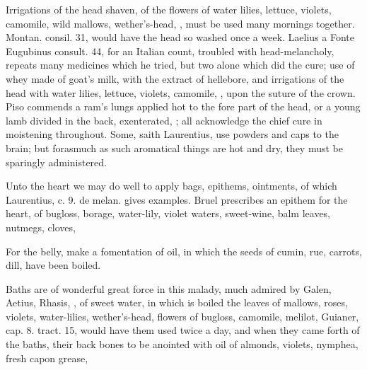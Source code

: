 Irrigations of the head shaven, of the flowers of water lilies,
lettuce, violets, camomile, wild mallows, wether's-head, \etc{}, must be
used many mornings together. Montan. consil. 31, would have the head so
washed once a week. \textlatin{Laelius a Fonte Eugubinus consult. 44}, for an
Italian count, troubled with head-melancholy, repeats many medicines
which he tried, but two alone which did the cure; use of whey
made of goat's milk, with the extract of hellebore, and irrigations of
the head with water lilies, lettuce, violets, camomile, \etc{}, upon the
suture of the crown. Piso commends a ram's lungs applied hot to the
fore part of the head, or a young lamb divided in the back,
exenterated, \etc{}; all acknowledge the chief cure in moistening
throughout. Some, saith Laurentius, use powders and caps to the brain;
but forasmuch as such aromatical things are hot and dry, they must be
sparingly administered.

Unto the heart we may do well to apply bags, epithems, ointments, of
which Laurentius, c. 9. de melan. gives examples. Bruel prescribes an
epithem for the heart, of bugloss, borage, water-lily, violet waters,
sweet-wine, balm leaves, nutmegs, cloves, \etc{}

For the belly, make a fomentation of oil, in which the seeds of
cumin, rue, carrots, dill, have been boiled.

Baths are of wonderful great force in this malady, much admired by
 Galen, Aetius, Rhasis, \etc{}, of sweet water, in which is
boiled the leaves of mallows, roses, violets, water-lilies,
wether's-head, flowers of bugloss, camomile, melilot, \etc{} Guianer, cap.
8. tract. 15, would have them used twice a day, and when they came
forth of the baths, their back bones to be anointed with oil of
almonds, violets, nymphea, fresh capon grease, \etc{}

